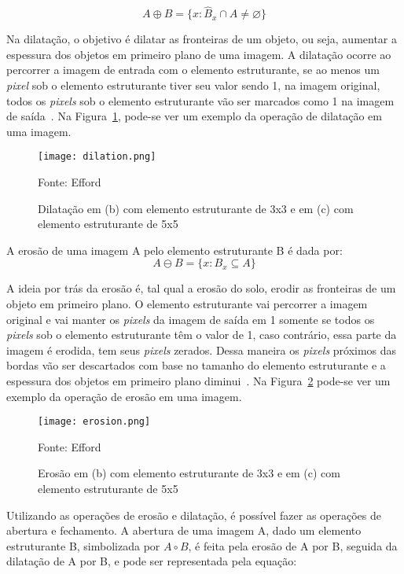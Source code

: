 \begin{displaymath}
A \oplus B = \{x : {\hat{B}}_x \cap A \neq \varnothing \}
\end{displaymath}

Na dilatação, o objetivo é dilatar as fronteiras de um objeto, ou seja, aumentar
a espessura dos objetos em primeiro plano de uma imagem. A dilatação ocorre ao
percorrer a imagem de entrada com o elemento estruturante, se ao menos um
\emph{pixel} sob o elemento estruturante tiver seu valor sendo 1, na imagem
original, todos os \emph{pixels} sob o elemento estruturante vão ser marcados
como 1 na imagem de saída~\cite{opencv2014morph}. Na
Figura~\ref{fig:dilation_ex}, pode-se ver um exemplo da operação de dilatação em
uma imagem.

\begin{figure}[H]
	\centering
	\texttt{[image: dilation.png]}
	\caption{Dilatação em (b) com elemento estruturante de 3x3 e em (c) com elemento estruturante de 5x5}
Fonte: Efford~\cite{efford2000digital}
	\label{fig:dilation_ex}
\end{figure}

A erosão de uma imagem A pelo elemento estruturante B é dada por:
\begin{displaymath}
A \ominus B = \{ x : B_x \subseteq A \}
\end{displaymath}

A ideia por trás da erosão é, tal qual a erosão do solo, erodir as fronteiras de
um objeto em primeiro plano. O elemento estruturante vai percorrer a imagem
original e vai manter os \emph{pixels} da imagem de saída em 1 somente se todos
os \emph{pixels} sob o elemento estruturante têm o valor de 1, caso contrário,
essa parte da imagem é erodida, tem seus \emph{pixels} zerados. Dessa maneira os
\emph{pixels} próximos das bordas vão ser descartados com base no tamanho do
elemento estruturante e a espessura dos objetos em primeiro plano
diminui~\cite{opencv2014morph}. Na Figura~\ref{fig:erosion_ex} pode-se ver um
exemplo da operação de erosão em uma imagem.

\begin{figure}[H]
	\centering
	\texttt{[image: erosion.png]}
	\caption{Erosão em (b) com elemento estruturante de 3x3 e em (c) com elemento estruturante de 5x5}
Fonte: Efford~\cite{efford2000digital}
	\label{fig:erosion_ex}
\end{figure}

Utilizando as operações de erosão e dilatação, é possível fazer as operações de
abertura e fechamento. A abertura de uma imagem A, dado um elemento estruturante
B, simbolizada por $A \circ B$, é feita pela erosão de A por B, seguida da
dilatação de A por B, e pode ser representada pela equação:

